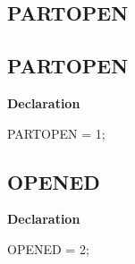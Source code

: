 \documentclass{report}
\newif\ifpdf
\begin{document}
\subsection*{\large{\textbf{PARTOPEN}}\normalsize\hspace{1ex}\hrulefill}
\else
\subsection*{PARTOPEN}
\fi
\label{ok_vorbisfile-PARTOPEN}
\begin{list}{}{
\setlength{\itemindent}{0cm}
\setlength{\listparindent}{0cm}
\setlength{\leftmargin}{\evensidemargin}
\addtolength{\leftmargin}{\tmplength}
\settowidth{\labelsep}{X}
\addtolength{\leftmargin}{\labelsep}
\setlength{\labelwidth}{\tmplength}
}
\item[\textbf{Declaration}\hfill]
\ifpdf
\begin{flushleft}
\fi
\begin{ttfamily}
PARTOPEN  = 1;\end{ttfamily}

\ifpdf
\end{flushleft}
\fi

\end{list}
\ifpdf
\subsection*{\large{\textbf{OPENED}}\normalsize\hspace{1ex}\hrulefill}
\else
\subsection*{OPENED}
\fi
\label{ok_vorbisfile-OPENED}
\begin{list}{}{
\setlength{\itemindent}{0cm}
\setlength{\listparindent}{0cm}
\setlength{\leftmargin}{\evensidemargin}
\addtolength{\leftmargin}{\tmplength}
\settowidth{\labelsep}{X}
\addtolength{\leftmargin}{\labelsep}
\setlength{\labelwidth}{\tmplength}
}
\item[\textbf{Declaration}\hfill]
\ifpdf
\begin{flushleft}
\fi
\begin{ttfamily}
OPENED    = 2;\end{ttfamily}

\ifpdf
\end{flushleft}
\fi

\end{list}
\ifpdf
\end{document}
